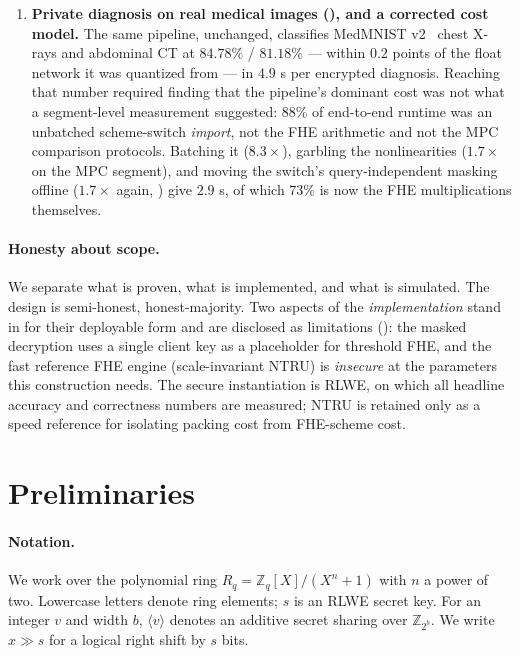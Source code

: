 \documentclass[11pt]{article}
\theoremstyle{plain}
\theoremstyle{definition}
\theoremstyle{remark}
\newcommand{\Z}{\mathbb{Z}}
\begin{document}
\begin{enumerate}
\item \textbf{Private diagnosis on real medical images
(), and a corrected cost model.} The same pipeline,
unchanged, classifies MedMNIST v2~\cite{MedMNIST} chest X-rays and abdominal
CT at $84.78\%$ / $81.18\%$ --- within $0.2$ points of the float network it
was quantized from --- in $4.9$ s per encrypted diagnosis. Reaching that
number required finding that the pipeline's dominant cost was not what a
segment-level measurement suggested: $88\%$ of end-to-end runtime was an
unbatched scheme-switch \emph{import}, not the FHE arithmetic and not the MPC
comparison protocols. Batching it ($8.3\times$), garbling the
nonlinearities ($1.7\times$ on the MPC segment), and moving the switch's
query-independent masking offline ($1.7\times$ again, )
give $2.9$ s, of which $73\%$ is now the FHE multiplications themselves.
\end{enumerate}

\paragraph{Honesty about scope.} We separate what is proven, what is
implemented, and what is simulated. The design is semi-honest,
honest-majority. Two aspects of the \emph{implementation} stand in for their
deployable form and are disclosed as limitations (): the
masked decryption uses a single client key as a placeholder for threshold
FHE, and the fast reference FHE engine (scale-invariant NTRU) is
\emph{insecure} at the parameters this construction needs. The secure
instantiation is RLWE, on which all headline accuracy and correctness
numbers are measured; NTRU is retained only as a speed reference for
isolating packing cost from FHE-scheme cost.

\section{Preliminaries}\label{sec:prelim}

\paragraph{Notation.} We work over the polynomial ring
$R_q = \Z_q[X]/(X^n+1)$ with $n$ a power of two. Lowercase letters denote
ring elements; $s$ is an RLWE secret key. For an integer $v$ and width $b$,
$\langle v\rangle$ denotes an additive secret sharing over $\Z_{2^b}$. We
write $x \gg s$ for a logical right shift by $s$ bits.
\end{document}
